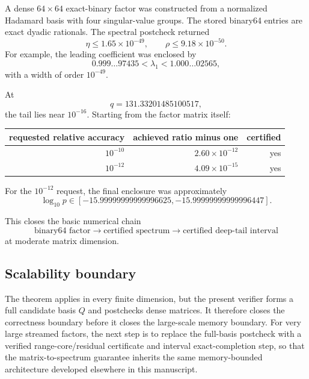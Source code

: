 A dense \(64\times64\) exact-binary factor was constructed from a normalized
Hadamard basis with four singular-value groups.  The stored binary64 entries
are exact dyadic rationals.  The spectral postcheck returned
\[
\eta\le1.65\times10^{-49},
\qquad
\rho\le9.18\times10^{-50}.
\]
For example, the leading coefficient was enclosed by
\[
0.999\ldots97435
<
\lambda_1
<
1.000\ldots02565,
\]
with a width of order \(10^{-49}\).

At
\[
q=131.33201485100517,
\]
the tail lies near \(10^{-16}\).  Starting from the factor matrix itself:

\begin{center}
\begin{tabular}{@{}rrr@{}}
\toprule
requested relative accuracy & achieved ratio minus one & certified\\
\midrule
$10^{-10}$ & $2.60\times10^{-12}$ & yes\\
$10^{-12}$ & $4.09\times10^{-15}$ & yes\\
\bottomrule
\end{tabular}
\end{center}

For the \(10^{-12}\) request, the final enclosure was approximately
\[
\log_{10}p
\in
[-15.99999999999996625,
 -15.99999999999996447].
\]

This closes the basic numerical chain
\[
\boxed{
\text{binary64 factor}
\longrightarrow
\text{certified spectrum}
\longrightarrow
\text{certified deep-tail interval}
}
\]
at moderate matrix dimension.

\subsection{Scalability boundary}

The theorem applies in every finite dimension, but the present verifier forms a full candidate
basis \(Q\) and postchecks dense matrices.  It therefore closes the correctness
boundary before it closes the large-scale memory boundary.  For very large
streamed factors, the next step is to replace the full-basis postcheck with a
verified range-core/residual certificate and interval exact-completion step,
so that the matrix-to-spectrum guarantee inherits the same memory-bounded
architecture developed elsewhere in this manuscript.



